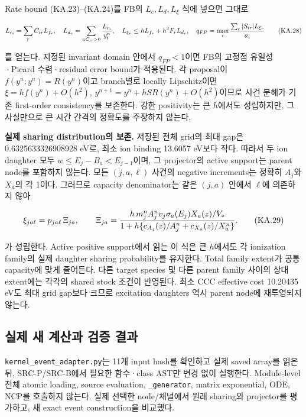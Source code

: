 Rate bound (KA.23)--(KA.24)를 FB의 \(L_c,L_d,L_\xi\) 식에 넣으면 그대로

\[
 L_{c_i}=\sum_r C_{ir}L_{f_r},\quad
 L_{d_r}=\sum_{i:C_{ir}>0}{L_{c_i}\over y_i^n},\quad
 L_{\xi_r}\le hL_{f_r}+h^2 F_rL_{d_r},\quad
 q_{FP}=\max_i{\sum_r|S_{ir}|L_{\xi_r}\over a_i}
 \tag{KA.28}
\]

를 얻는다. 지정된 invariant domain 안에서 \(q_{FP}<1\)이면 FB의 고정점 유일성·Picard 수렴·residual error bound가 적용된다. 각 proposal이 \(f(y^n;y^n)=R(y^n)\)이고 branch별로 locally Lipschitz이면 \(\xi=hf(y^n)+O(h^2)\), \(y^{n+1}=y^n+hSR(y^n)+O(h^2)\)이므로 사건 분해가 기존 first-order consistency를 보존한다. 강한 positivity는 큰 \(h\)에서도 성립하지만, 그 사실만으로 큰 시간 간격의 정확도를 주장하지 않는다.

\textbf{실제 sharing distribution의 보존.} 저장된 전체 grid의 최대 gap은 0.6325633326908928 eV로, 최소 ion binding 13.6057 eV보다 작다. 따라서 두 ion daughter 모두 \(w\le E_j-B_a<E_{j-1}\)이며, 그 projector의 active support는 parent node를 포함하지 않는다. 모든 \((j,a,\ell)\) 사건의 negative increments는 정확히 \(A_j\)와 \(X_a\)의 각 1이다. 그러므로 capacity denominator는 같은 \((j,a)\) 안에서 \(\ell\)에 의존하지 않아

\[
 \xi_{ja\ell}=p_{ja\ell}\,\Xi_{ja},\qquad
 \Xi_{ja}={h\,m_j^n A_j^n v_j\sigma_a(E_j)X_a(z)/V_*
  \over1+h\{c_{A_j}(z)/A_j^n+c_{X_a}(z)/X_a^n\}}.
 \tag{KA.29}
\]

가 성립한다. Active positive support에서 읽는 이 식은 큰 \(h\)에서도 각 ionization family의 실제 daughter sharing probability를 유지한다. Total family extent가 공통 capacity에 맞게 줄어든다. 다른 target species 및 다른 parent family 사이의 상대 extent에는 각각의 shared stock 조건이 반영된다. 최소 CCC effective cost 10.20435 eV도 최대 grid gap보다 크므로 excitation daughters 역시 parent node에 재투영되지 않는다.

\hypertarget{uxc2e4uxc81c-uxc0c8-uxacc4uxc0b0uxacfc-uxac80uxc99d-uxacb0uxacfc}{%
\subsection{실제 새 계산과 검증 결과}\label{uxc2e4uxc81c-uxc0c8-uxacc4uxc0b0uxacfc-uxac80uxc99d-uxacb0uxacfc}}

\texttt{kernel\_event\_adapter.py}는 11개 input hash를 확인하고 실제 saved array를 읽은 뒤, SRC-P/SRC-B에서 필요한 함수·class AST만 변경 없이 실행한다. Module-level 전체 atomic loading, source evaluation, \texttt{\_generator}, matrix exponential, ODE, NCP를 호출하지 않는다. 실제 선택한 node/채널에서 원래 sharing와 projector를 평가하고, 새 exact event construction을 비교했다.

